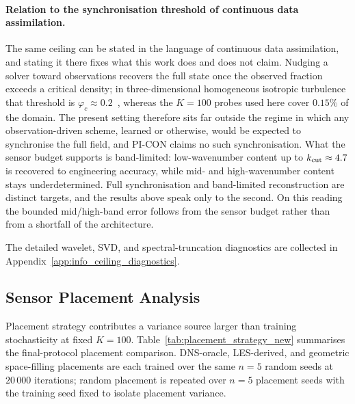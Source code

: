 \paragraph{Relation to the synchronisation threshold of continuous data assimilation.}
The same ceiling can be stated in the language of continuous data assimilation, and stating it there fixes what this work does and does not claim. Nudging a solver toward observations recovers the full state once the observed fraction exceeds a critical density; in three-dimensional homogeneous isotropic turbulence that threshold is $\varphi_c \approx 0.2$~\cite{ClarkDiLeoni2020PRX}, whereas the $K=100$ probes used here cover $0.15\%$ of the domain. The present setting therefore sits far outside the regime in which any observation-driven scheme, learned or otherwise, would be expected to synchronise the full field, and PI-CON claims no such synchronisation. What the sensor budget supports is band-limited: low-wavenumber content up to $k_{\rm cut}\approx 4.7$ is recovered to engineering accuracy, while mid- and high-wavenumber content stays underdetermined. Full synchronisation and band-limited reconstruction are distinct targets, and the results above speak only to the second. On this reading the bounded mid/high-band error follows from the sensor budget rather than from a shortfall of the architecture.

The detailed wavelet, SVD, and spectral-truncation diagnostics are collected in Appendix~\ref{app:info_ceiling_diagnostics}.

\subsection{Sensor Placement Analysis}
\label{sec:placement_analysis}

Placement strategy contributes a variance source larger than training stochasticity at fixed $K=100$. Table~\ref{tab:placement_strategy_new} summarises the final-protocol placement comparison. DNS-oracle, LES-derived, and geometric space-filling placements are each trained over the same $n=5$ random seeds at $20\,000$ iterations; random placement is repeated over $n=5$ placement seeds with the training seed fixed to isolate placement variance.


